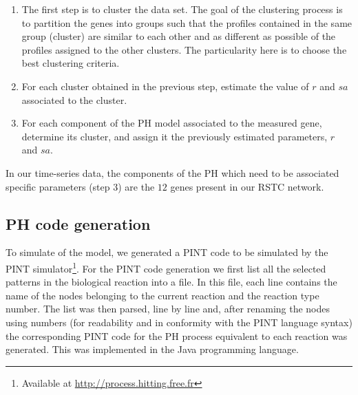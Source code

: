 \documentclass[11pt,a4paper,twoside]{epig}
\begin{document}
\begin{enumerate}
 \item The first step is to cluster the data set. The goal of the clustering process is to partition the genes into groups such that the 
 profiles contained in the same group (cluster) are similar to each other and as different as possible of the profiles assigned to the other
 clusters. The particularity here is to choose the best clustering criteria.
 \item For each cluster obtained in the previous step, estimate the value of $r$ and $sa$ associated to the cluster.
 \item For each component of the PH model associated to the measured gene, determine its cluster, and assign it the previously  estimated  parameters, $r$ and $sa$.
\end{enumerate}

In our time-series data, the components of the PH which need to be associated specific parameters (step 3) are the $12$ genes present in our RSTC network.


\subsection{PH code generation}

To simulate of the model, we generated a PINT code to be simulated by the PINT simulator\footnote{Available at \url{http://process.hitting.free.fr}}. For the PINT code 
generation we first list all the selected patterns in the biological reaction into a file. In this file, each line contains the 
name of the nodes belonging to the current reaction and the reaction type number. The list was then parsed, line by line and, 
after renaming the nodes using numbers (for readability and in conformity with the PINT language syntax) the corresponding PINT code
for the PH process equivalent to each reaction was generated. This was implemented in the Java programming language.
\end{document}
